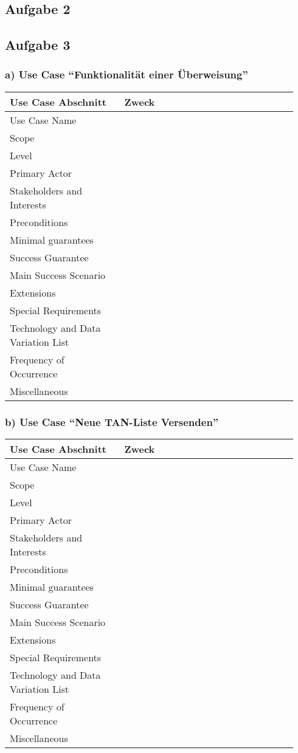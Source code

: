 \documentclass[a4paper,10pt]{article}
\begin{document}
\subsection*{Aufgabe 2}
\subsection*{Aufgabe 3}
\subsubsection*{a) Use Case ``Funktionalität einer Überweisung''}
\begin{tabular}{|p{0.37\linewidth}|p{0.57\linewidth}|}
\hline
\textbf{Use Case Abschnitt} & \textbf{Zweck} \\
\hline
Use Case Name & \\
\hline
Scope & \\
\hline
Level & \\
\hline
Primary Actor & \\
\hline
Stakeholders and Interests & \\
\hline
Preconditions & \\
\hline
Minimal guarantees & \\
\hline
Success Guarantee & \\
\hline
Main Success Scenario & \\
\hline
Extensions & \\
\hline
Special Requirements & \\
\hline
Technology and Data Variation List & \\
\hline
Frequency of Occurrence & \\
\hline
Miscellaneous & \\
\hline
\hline
\end{tabular}

\subsubsection*{b) Use Case ``Neue TAN-Liste Versenden''}
\begin{tabular}{|p{0.37\linewidth}|p{0.57\linewidth}|}
\hline
\textbf{Use Case Abschnitt} & \textbf{Zweck} \\
\hline
Use Case Name & \\
\hline
Scope & \\
\hline
Level & \\
\hline
Primary Actor & \\
\hline
Stakeholders and Interests & \\
\hline
Preconditions & \\
\hline
Minimal guarantees & \\
\hline
Success Guarantee & \\
\hline
Main Success Scenario & \\
\hline
Extensions & \\
\hline
Special Requirements & \\
\hline
Technology and Data Variation List & \\
\hline
Frequency of Occurrence & \\
\hline
Miscellaneous & \\
\hline
\hline
\end{tabular}
\end{document}

